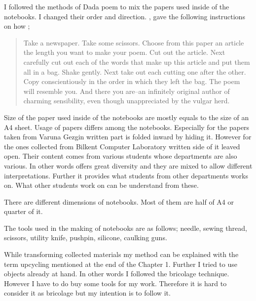 I followed the methods of Dada poem to mix the papers used inside of the notebooks. I changed their order and direction. 
\cite{tzara1977seven}, gave the following instructions on how ;

\begin{quote}
Take a newspaper. Take some scissors. Choose from this paper an article the length you want to make your poem. Cut out the article. Next carefully cut out each of the words that make up this article and put them all in a bag. Shake gently. Next take out each cutting one after the other. Copy conscientiously in the order in which they left the bag. The poem will resemble you. And there you are--an infinitely original author of       charming sensibility, even though unappreciated by the vulgar herd.
\end{quote}


Size of the paper used inside of the notebooks are mostly equals to the size of an A4 sheet. Usage of papers differs among the notebooks. Especially for the papers taken from Varuna Gezgin written part is folded inward by hiding it. However for the ones collected from Bilkent Computer Laboratory written side of it leaved open. Their content comes from various students whose departments are also various. In other words offers great diversity and they are mixed to allow different interpretations. Further it provides what students from other departments works on. What other students work on can be understand from these.

There are different dimensions of notebooks. Most of them are half of A4 or quarter of it.




The tools used in the making of notebooks are as follows; needle, sewing thread, scissors, utility knife, pushpin, silicone, caulking guns.

While transforming collected materials my method can be explained with the term upcycling mentioned at the end of the Chapter 1. Further I tried to use objects already at hand. In other words I followed the bricolage technique. However I have to do buy some tools for my work. Therefore it is hard to consider it as bricolage but my intention is to follow it.

